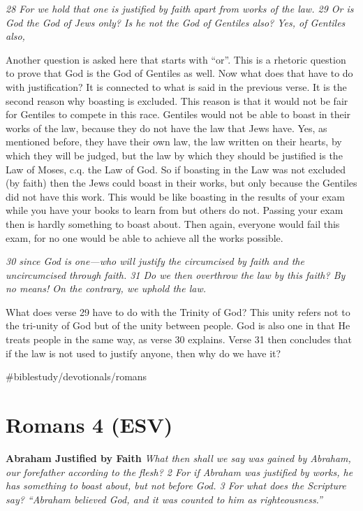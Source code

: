 \emph{28 For we hold that one is justified by faith apart from works of
the law. 29 Or is God the God of Jews only? Is he not the God of
Gentiles also? Yes, of Gentiles also,}

Another question is asked here that starts with ``or''. This is a
rhetoric question to prove that God is the God of Gentiles as well. Now
what does that have to do with justification? It is connected to what is
said in the previous verse. It is the second reason why boasting is
excluded. This reason is that it would not be fair for Gentiles to
compete in this race. Gentiles would not be able to boast in their works
of the law, because they do not have the law that Jews have. Yes, as
mentioned before, they have their own law, the law written on their
hearts, by which they will be judged, but the law by which they should
be justified is the Law of Moses, c.q. the Law of God. So if boasting in
the Law was not excluded (by faith) then the Jews could boast in their
works, but only because the Gentiles did not have this work. This would
be like boasting in the results of your exam while you have your books
to learn from but others do not. Passing your exam then is hardly
something to boast about. Then again, everyone would fail this exam, for
no one would be able to achieve all the works possible.

\emph{30 since God is one---who will justify the circumcised by faith
and the uncircumcised through faith. 31 Do we then overthrow the law by
this faith? By no means! On the contrary, we uphold the law.}

What does verse 29 have to do with the Trinity of God? This unity refers
not to the tri-unity of God but of the unity between people. God is also
one in that He treats people in the same way, as verse 30 explains.
Verse 31 then concludes that if the law is not used to justify anyone,
then why do we have it?

\#biblestudy/devotionals/romans

\hypertarget{romans-4-esv}{%
\section{Romans 4 (ESV)}\label{romans-4-esv}}

\textbf{Abraham Justified by Faith} \emph{What then shall we say was
gained by Abraham, our forefather according to the flesh? 2 For if
Abraham was justified by works, he has something to boast about, but not
before God. 3 For what does the Scripture say? ``Abraham believed God,
and it was counted to him as righteousness.''}

